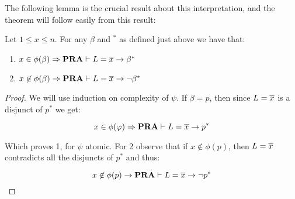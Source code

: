 \documentclass[../main.tex]{subfiles}
\begin{document}
The following lemma is the crucial result about this interpretation, and the
theorem will follow easily from this result:
\begin{lem}
	\label{lem:10}
	Let $1\leq x\leq n$. For any $\beta$ and $^*$ as defined just above we
	have that:
	\begin{enumerate}
		\item $x\in\phi(\beta)\Rightarrow\text{\textbf{PRA}}\vdash L=\overline x\rightarrow
			\beta^*$
		\item $x\not\in\phi(\beta)\Rightarrow\text{\textbf{PRA}}\vdash L=\overline
			x\rightarrow \neg \beta^*$
	\end{enumerate}
\end{lem}
\begin{proof}
We will use induction on complexity of $\psi$. If $\beta=p$, then since $L=\overline
x$ is a
disjunct of $p^*$ we get:

$$x\in\phi(\varphi)\Rightarrow\text{\textbf{PRA}}\vdash L=\overline x\rightarrow p^*$$

Which proves 1, for $\psi$ atomic. For 2 observe that if $x\not\in\phi( p)$, then
$L=\overline x$ contradicts all the  disjuncts of $p^*$ and thus:

$$x\not\in\phi(p)\rightarrow\text{\textbf{PRA}}\vdash L=\overline x\rightarrow\neg p^*$$


\end{proof}
\end{document}
